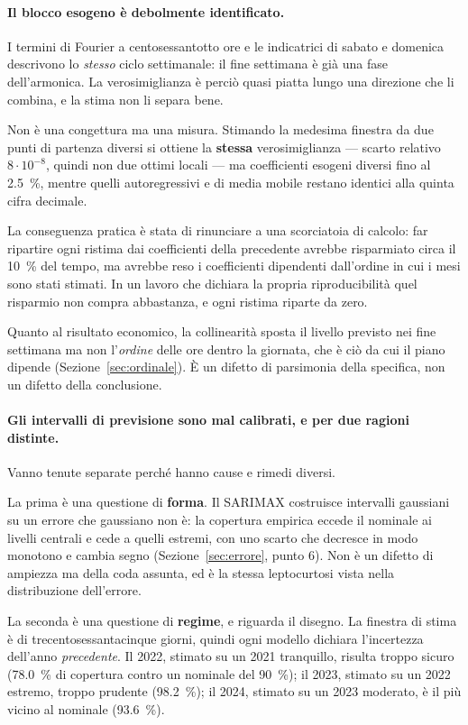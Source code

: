 \paragraph{Il blocco esogeno \`e debolmente identificato.} I termini di Fourier a
centosessantotto ore e le indicatrici di sabato e domenica descrivono lo \emph{stesso} ciclo
settimanale: il fine settimana \`e gi\`a una fase dell'armonica. La verosimiglianza \`e perci\`o
quasi piatta lungo una direzione che li combina, e la stima non li separa bene.

Non \`e una congettura ma una misura. Stimando la medesima finestra da due punti di partenza
diversi si ottiene la \textbf{stessa} verosimiglianza --- scarto relativo $8 \cdot 10^{-8}$,
quindi non due ottimi locali --- ma coefficienti esogeni diversi fino al \SI{2,5}{\percent},
mentre quelli autoregressivi e di media mobile restano identici alla quinta cifra decimale.

La conseguenza pratica \`e stata di rinunciare a una scorciatoia di calcolo: far ripartire ogni
ristima dai coefficienti della precedente avrebbe risparmiato circa il \SI{10}{\percent} del
tempo, ma avrebbe reso i coefficienti dipendenti dall'ordine in cui i mesi sono stati stimati.
In un lavoro che dichiara la propria riproducibilit\`a quel risparmio non compra abbastanza, e
ogni ristima riparte da zero.

Quanto al risultato economico, la collinearit\`a sposta il livello previsto nei fine settimana
ma non l'\emph{ordine} delle ore dentro la giornata, che \`e ci\`o da cui il piano dipende
(Sezione~\ref{sec:ordinale}). \`E un difetto di parsimonia della specifica, non un difetto
della conclusione.

\paragraph{Gli intervalli di previsione sono mal calibrati, e per due ragioni distinte.} Vanno
tenute separate perch\'e hanno cause e rimedi diversi.

La prima \`e una questione di \textbf{forma}. Il \ac{SARIMAX} costruisce intervalli gaussiani
su un errore che gaussiano non \`e: la copertura empirica eccede il nominale ai livelli
centrali e cede a quelli estremi, con uno scarto che decresce in modo monotono e cambia segno
(Sezione~\ref{sec:errore}, punto 6). Non \`e un difetto di ampiezza ma della coda assunta, ed
\`e la stessa leptocurtosi vista nella distribuzione dell'errore.

La seconda \`e una questione di \textbf{regime}, e riguarda il disegno. La finestra di stima
\`e di trecentosessantacinque giorni, quindi ogni modello dichiara l'incertezza dell'anno
\emph{precedente}. Il 2022, stimato su un 2021 tranquillo, risulta troppo sicuro
(\SI{78,0}{\percent} di copertura contro un nominale del \SI{90}{\percent}); il 2023, stimato
su un 2022 estremo, troppo prudente (\SI{98,2}{\percent}); il 2024, stimato su un 2023
moderato, \`e il pi\`u vicino al nominale (\SI{93,6}{\percent}).

